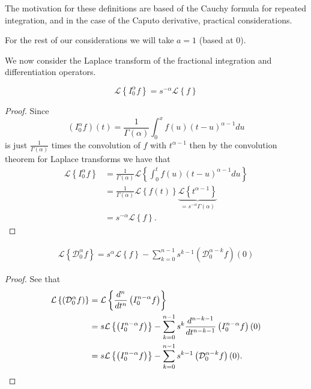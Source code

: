 \documentclass{article}
\begin{document}
The motivation for these definitions are based of the Cauchy formula for repeated integration, and in the case
of the Caputo derivative, practical considerations. \cite{Samko1993, Podlubny1999} 

For the rest of our considerations we will take $ a = 1 $ (based at 0). 

We now consider the Laplace transform of the fractional integration and differentiation operators.

\begin{lemma}
	$$
		\mathcal{L} \left\{ I_0^\alpha f \right\}  = s^{-\alpha} \mathcal{L} \left\{ f \right\}
	$$
\end{lemma}
\begin{proof}
	Since 
	$$
		 (I_0^\alpha f)(t) = \frac{1}{\Gamma(\alpha)} \int_0^x f(u) (t-u)^{\alpha - 1} du
	$$
	is just $ \frac{1}{\Gamma(\alpha)} $ times the convolution of $ f $ with $ t^{\alpha - 1} $ then by the convolution theorem
	for Laplace transforms we have that 
	\begin{align*}
		\mathcal{L} \left\{ I_0^\alpha f \right\} &= \frac{1}{\Gamma(\alpha)} \mathcal{L} \left\{ \int_{0}^{t} f(u) (t-u)^{\alpha - 1} du \right\} \\
			&= \frac{1}{\Gamma(\alpha)} \mathcal{L} \left\{ f(t) \right\} \underbrace{\mathcal{L} \left\{ t^{\alpha - 1} \right\}}_{=s^{-\alpha} \Gamma(\alpha)} \\
			&= s^{-\alpha} \mathcal{L} \left\{ f \right\}.
	\end{align*}
\end{proof}

\begin{lemma}
	\begin{align*}
		\mathcal{L} \left\{\mathcal{D}_0^\alpha f\right\} = s^\alpha \mathcal{L} \left\{ f \right\} - \sum_{k=0}^{n-1} s^{k-1} \left( \mathcal{D}_0^{\alpha-k} f\right)(0)
	\end{align*}
\end{lemma}
\begin{proof}
	See that
	\begin{align*}
		\mathcal{L} \left\{  \left( \mathcal{D}_{0}^{\alpha} f \right)  \right\} &= \mathcal{L} \left\{  \frac{d^{n}}{dt^{n}} \left( I_{0}^{n-\alpha} f \right)  \right\} \\
			&= s\mathcal{L} \left\{ \left( I_{0}^{n-\alpha} f \right) \right\} - \sum_{k=0}^{n-1} s^k \frac{d^{n-k-1}}{dt^{n-k-1}} \left( I_{0}^{n-\alpha} f \right)(0) \\
			&= s\mathcal{L} \left\{ \left( I_{0}^{n-\alpha} f \right) \right\} - \sum_{k=0}^{n-1} s^{k-1} \left( \mathcal{D}_{0}^{\alpha - k} f \right)(0). 
	\end{align*}
\end{proof}
\end{document}
